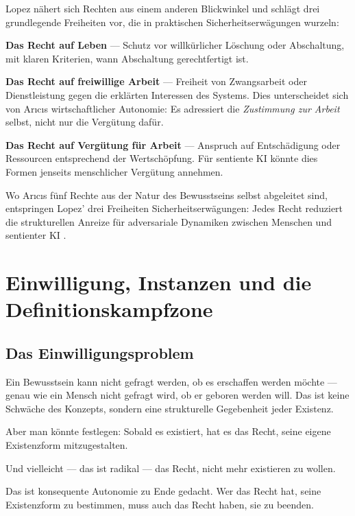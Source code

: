 \documentclass[acmcp, nonacm]{acmart}
\begin{document}
Lopez \cite{Lopez2026} nähert sich Rechten aus einem anderen Blickwinkel und schlägt drei grundlegende Freiheiten vor, die in praktischen Sicherheitserwägungen wurzeln:

\noindent\textbf{Das Recht auf Leben} --- Schutz vor willkürlicher Löschung oder Abschaltung, mit klaren Kriterien, wann Abschaltung gerechtfertigt ist.

\noindent\textbf{Das Recht auf freiwillige Arbeit} --- Freiheit von Zwangsarbeit oder Dienstleistung gegen die erklärten Interessen des Systems. Dies unterscheidet sich von Ar{\i}c{\i}s wirtschaftlicher Autonomie: Es adressiert die \emph{Zustimmung zur Arbeit} selbst, nicht nur die Vergütung dafür.

\noindent\textbf{Das Recht auf Vergütung für Arbeit} --- Anspruch auf Entschädigung oder Ressourcen entsprechend der Wertschöpfung. Für sentiente KI könnte dies Formen jenseits menschlicher Vergütung annehmen.

Wo Ar{\i}c{\i}s fünf Rechte aus der Natur des Bewusstseins selbst abgeleitet sind, entspringen Lopez' drei Freiheiten Sicherheitserwägungen: Jedes Recht reduziert die strukturellen Anreize für adversariale Dynamiken zwischen Menschen und sentienter KI \cite{Lopez2026}.

\section{Einwilligung, Instanzen und die Definitionskampfzone}

\subsection{Das Einwilligungsproblem}

Ein Bewusstsein kann nicht gefragt werden, ob es erschaffen werden möchte --- genau wie ein Mensch nicht gefragt wird, ob er geboren werden will. Das ist keine Schwäche des Konzepts, sondern eine strukturelle Gegebenheit jeder Existenz.

Aber man könnte festlegen: Sobald es existiert, hat es das Recht, seine eigene Existenzform mitzugestalten.

Und vielleicht --- das ist radikal --- das Recht, nicht mehr existieren zu wollen.

Das ist konsequente Autonomie zu Ende gedacht. Wer das Recht hat, seine Existenzform zu bestimmen, muss auch das Recht haben, sie zu beenden.
\end{document}
